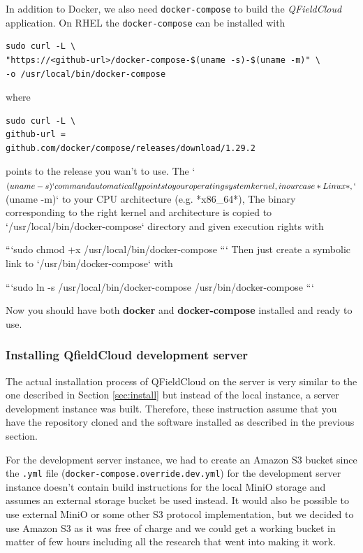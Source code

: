 \documentclass{article}
\begin{document}
In addition to Docker, we also need \texttt{docker-compose} to build the \emph{QFieldCloud} application. On RHEL the \texttt{docker-compose} can be installed with
\begin{verbatim}
sudo curl -L \ 
"https://<github-url>/docker-compose-$(uname -s)-$(uname -m)" \ 
-o /usr/local/bin/docker-compose
\end{verbatim}
where
\begin{verbatim}
sudo curl -L \ 
github-url = 
github.com/docker/compose/releases/download/1.29.2
\end{verbatim}
\begin{markdown}
points to the release you wan't to use. The `$(uname -s)` command automatically points to your operating system kernel, in our case *Linux*, `$(uname -m)` to your CPU architecture (e.g. *x86_64*), The binary corresponding to the right kernel and architecture is copied to `/usr/local/bin/docker-compose` directory and given execution rights with

```sudo chmod +x /usr/local/bin/docker-compose
```
Then just create a symbolic link to `/usr/bin/docker-compose` with

```sudo ln -s /usr/local/bin/docker-compose /usr/bin/docker-compose
```
\end{markdown}

Now you should have both \textbf{docker} and \textbf{docker-compose} installed and ready to use. 

\subsubsection{Installing QfieldCloud development server}
The actual installation process of QFieldCloud on the server is very similar to the one described in Section \ref{sec:install} but instead of the local instance, a server development instance was built. Therefore, these instruction assume that you have the repository cloned and the software installed as described in the previous section. 

For the development server instance, we had to create an Amazon S3 bucket since the \texttt{.yml} file (\texttt{docker-compose.override.dev.yml}) for the development server instance doesn't contain build instructions for the local MiniO storage and assumes an external storage bucket be used instead. It would also be possible to use external MiniO or some other S3 protocol implementation, but we decided to use Amazon S3 as it was free of charge and we could get a working bucket in matter of few hours including all the research that went into making it work. 
\end{document}

